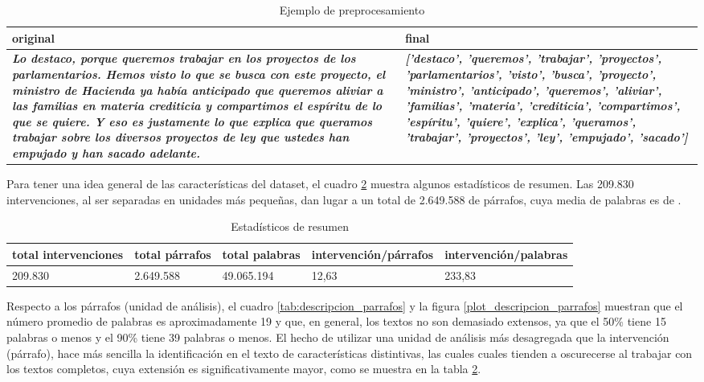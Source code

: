 \documentclass[
  12pt,
]{article}
\begin{document}
\begin{table}[H]

\caption{\label{tab:ejemplo_preprocesamiento}Ejemplo de preprocesamiento}
\centering
\begin{tabular}[t]{>{\raggedright\arraybackslash}p{15em}>{\raggedright\arraybackslash}p{15em}}
\toprule
original & final\\
\midrule
\em{\textbf{Lo destaco, porque queremos trabajar en los proyectos de los parlamentarios. Hemos visto lo que se busca con este proyecto, el ministro de Hacienda ya había anticipado que queremos aliviar  a las familias en materia crediticia y compartimos el espíritu de lo que se quiere. Y eso es justamente lo que explica  que queramos trabajar sobre los diversos proyectos de ley que ustedes han empujado y han sacado adelante.}} & \em{\textbf{{}['destaco', 'queremos', 'trabajar', 'proyectos', 'parlamentarios', 'visto', 'busca', 'proyecto', 'ministro',  'anticipado', 'queremos', 'aliviar', 'familias', 'materia', 'crediticia', 'compartimos', 'espíritu',  'quiere', 'explica', 'queramos', 'trabajar', 'proyectos', 'ley', 'empujado', 'sacado']}}\\
\bottomrule
\end{tabular}
\end{table}

Para tener una idea general de las características del dataset, el
cuadro \ref{tab:descripcion_dataset} muestra algunos estadísticos de
resumen. Las 209.830 intervenciones, al ser separadas en unidades más
pequeñas, dan lugar a un total de 2.649.588 de párrafos, cuya media de
palabras es de .

\begin{table}[H]

\caption{\label{tab:descripcion_dataset}Estadísticos de resumen}
\centering
\begin{tabular}[t]{lllll}
\toprule
total intervenciones & total párrafos & total palabras & intervención/párrafos & intervención/palabras\\
\midrule
209.830 & 2.649.588 & 49.065.194 & 12,63 & 233,83\\
\bottomrule
\end{tabular}
\end{table}

Respecto a los párrafos (unidad de análisis), el cuadro
\ref{tab:descripcion_parrafos} y la figura
\ref{plot_descripcion_parrafos} muestran que el número promedio de
palabras es aproximadamente 19 y que, en general, los textos no son
demasiado extensos, ya que el 50\% tiene 15 palabras o menos y el 90\%
tiene 39 palabras o menos. El hecho de utilizar una unidad de análisis
más desagregada que la intervención (párrafo), hace más sencilla la
identificación en el texto de características distintivas, las cuales
cuales tienden a oscurecerse al trabajar con los textos completos, cuya
extensión es significativamente mayor, como se muestra en la tabla
\ref{tab:descripcion_dataset}.
\end{document}
